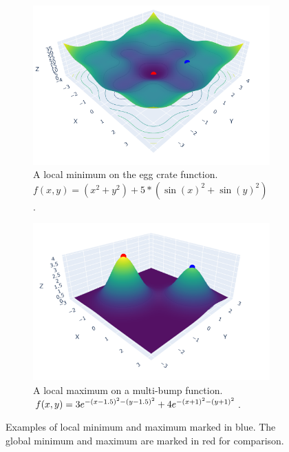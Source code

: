 \begin{figure}[h]
    \begin{subfigure}[b]{0.48\linewidth}
        \centering
        \includegraphics[width=\linewidth]{figures/2background/local_min.png}
        \caption{A local minimum on the egg crate function. \\
        $f(x,y) = (x^2 + y^2) + 5 * (\sin(x)^2 + \sin(y)^2)$.
        }
        \label{fig:local_min}
    \end{subfigure}
    \hfill
    \begin{subfigure}[b]{0.48\linewidth}
        \centering
        \includegraphics[width=\linewidth]{figures/2background/local_max.png}
        \caption{A local maximum on a multi-bump function. \\
        $f(x,y) = 3 e^{-(x-1.5)^2 - (y-1.5)^2} + \\
         4 e^{-(x+1)^2 - (y+1)^2}$.}
        \label{fig:local_max}
    \end{subfigure}
    \caption{Examples of local minimum and maximum marked in blue. The global minimum and maximum are marked in red for comparison.}
    \label{fig:local_min_max}
\end{figure}

